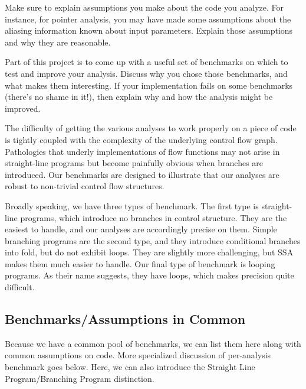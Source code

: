 \documentclass{article}
\theoremstyle{definition}
\begin{document}
\begin{framed}
  Make sure to explain assumptions you make about the code you
  analyze. For instance, for pointer analysis, you may have made some
  assumptions about the aliasing information known about input
  parameters. Explain those assumptions and why they are reasonable.

  Part of this project is to come up with a useful set of benchmarks
  on which to test and improve your analysis. Discuss why you chose
  those benchmarks, and what makes them interesting. If your
  implementation fails on some benchmarks (there's no shame in it!),
  then explain why and how the analysis might be improved.
\end{framed}

The difficulty of getting the various analyses to work properly on a
piece of code is tightly coupled with the complexity of the underlying
control flow graph. Pathologies that underly implementations of flow
functions may not arise in straight-line programs but become painfully
obvious when branches are introduced. Our benchmarks are designed to
illustrate that our analyses are robust to non-trivial control flow
structures.

Broadly speaking, we have three types of benchmark. The first type is
straight-line programs, which introduce no branches in control
structure. They are the easiest to handle, and our analyses are
accordingly precise on them. Simple branching programs are the second
type, and they introduce conditional branches into fold, but do not
exhibit loops. They are slightly more challenging, but SSA makes them
much easier to handle. Our final type of benchmark is looping
programs. As their name suggests, they have loops, which makes
precision quite difficult.

\subsection{Benchmarks/Assumptions in Common}
Because we have a common pool of benchmarks, we can list them here
along with common assumptions on code. More specialized discussion of
per-analysis benchmark goes below. Here, we can also introduce the
Straight Line Program/Branching Program distinction.
\end{document}
